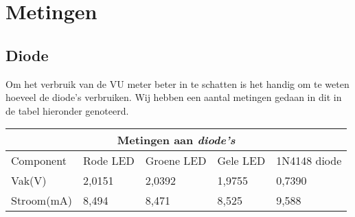 \section{Metingen}
\subsection{Diode}
Om het verbruik van de VU meter beter in te schatten is het handig om te weten hoeveel de diode's verbruiken. Wij hebben een aantal metingen gedaan in dit in de tabel hieronder genoteerd. 

\vspace{0.1in}

\begin{tabular}{ |p{2.3cm}||p{2.3cm}|p{2.3cm}|p{2.3cm}|p{2.3cm}|  }
 \hline
 \multicolumn{5}{|c|}{Metingen aan \textit{diode's}} \\
 \hline
  Component & Rode LED& Groene LED& Gele LED &1N4148 diode\\
 \hline
 Vak(V)   &2,0151 &2,0392& 1,9755 &0,7390\\
 \hline
Stroom(mA) &8,494 &8,471 &8,525 &9,588\\
 \hline
 \end{tabular}
 